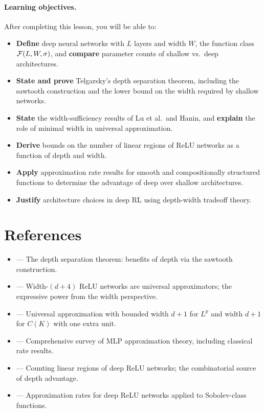\documentclass[11pt,a4paper]{article}
\begin{document}
\paragraph{Learning objectives.}
After completing this lesson, you will be able to:
\begin{itemize}[nosep]
  \item \textbf{Define} deep neural networks with $L$ layers and width
    $W$, the function class $\mathcal{F}(L, W, \sigma)$, and
    \textbf{compare} parameter counts of shallow vs.\ deep architectures.
  \item \textbf{State and prove} Telgarsky's depth separation theorem,
    including the sawtooth construction and the lower bound on the
    width required by shallow networks.
  \item \textbf{State} the width-sufficiency results of Lu et al.\
    and Hanin, and \textbf{explain} the role of minimal width in
    universal approximation.
  \item \textbf{Derive} bounds on the number of linear regions of
    ReLU networks as a function of depth and width.
  \item \textbf{Apply} approximation rate results for smooth and
    compositionally structured functions to determine the advantage of
    deep over shallow architectures.
  \item \textbf{Justify} architecture choices in deep RL using
    depth-width tradeoff theory.
\end{itemize}

\section{References}
\label{sec:references}

\begin{itemize}
  \item \citet{telgarsky2016} --- The depth separation theorem: benefits
    of depth via the sawtooth construction.
  \item \citet{lu2017} --- Width-$(d+4)$ ReLU networks are universal
    approximators; the expressive power from the width perspective.
  \item \citet{hanin2019} --- Universal approximation with bounded width
    $d+1$ for $L^p$ and width $d+1$ for $C(K)$ with one extra unit.
  \item \citet{pinkus1999} --- Comprehensive survey of MLP approximation
    theory, including classical rate results.
  \item \citet{montufar2014} --- Counting linear regions of deep
    ReLU networks; the combinatorial source of depth advantage.
  \item \citet{yarotsky2017} --- Approximation rates for deep ReLU
    networks applied to Sobolev-class functions.
\end{itemize}
\end{document}
